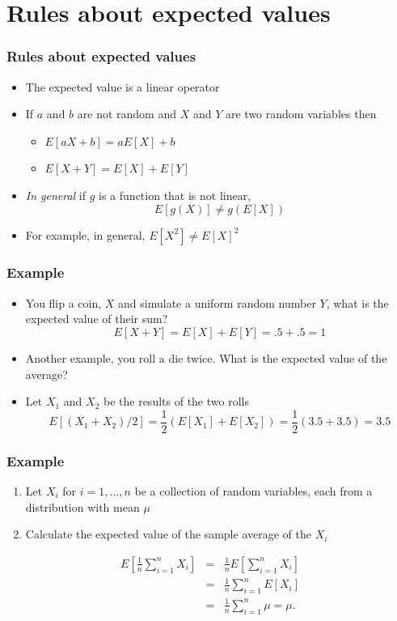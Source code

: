 \documentclass[aspectratio=169]{beamer}
\begin{document}
\section{Rules about expected values}
\begin{frame}\frametitle{Rules about expected values}
  \begin{itemize}
  \item The expected value is a linear operator 
  \item If $a$ and $b$ are not random and $X$ and $Y$ 
    are two random variables then
    \begin{itemize}
    \item $E[aX + b] = a E[X] + b$
    \item $E[X + Y] = E[X] + E[Y]$
    \end{itemize}
  \item {\em In general} if $g$ is a function that is not linear,
    $$
    E[g(X)] \neq g(E[X])
    $$
  \item For example, in general, $E[X^2] \neq E[X]^2$ 
  \end{itemize}
\end{frame}

\begin{frame}\frametitle{Example}
  \begin{itemize}
  \item  You flip a coin, $X$ and simulate a uniform random number $Y$, what 
    is the expected value of their sum? 
    $$
    E[X + Y] = E[X] + E[Y] = .5 + .5 = 1
    $$ 
  \item Another example, you roll a die twice. What is the expected value of
    the average? 
  \item Let $X_1$ and $X_2$ be the results of the two rolls
    $$
    E[(X_1 + X_2) / 2] = \frac{1}{2}(E[X_1] + E[X_2])
    = \frac{1}{2}(3.5 + 3.5) = 3.5
    $$
  \end{itemize}
\end{frame}


\begin{frame}\frametitle{Example}
  \begin{enumerate}
  \item Let $X_i$ for $i=1,\ldots,n$ be a collection of random
    variables, each from a distribution with mean $\mu$
  \item Calculate the expected value of the sample average of the $X_i$
  \end{enumerate}
  \begin{eqnarray*}
    E\left[ \frac{1}{n}\sum_{i=1}^n X_i\right]
    & = & \frac{1}{n} E\left[\sum_{i=1}^n X_i\right] \\
    & = & \frac{1}{n} \sum_{i=1}^n E\left[X_i\right] \\
    & = & \frac{1}{n} \sum_{i=1}^n \mu =  \mu.
  \end{eqnarray*}
\end{frame}
\end{document}
